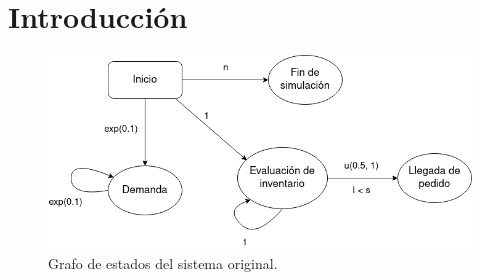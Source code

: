 \documentclass[12pt, spanish]{article}
\makeatletter
\let\thedate\@date
\makeatother
\begin{document}
\begin{titlepage}
    {\large \thedate}\\[0.5cm]
    {\doclicenseThis}

    \vfill

\end{titlepage}


\tableofcontents
\pagebreak



\section*{Introducción}


\begin{figure}[H]
  \centering
   \includegraphics[width=\textwidth]{grafo_sucesos_original.png}
	\caption{Grafo de estados del sistema original.}
\end{figure}
\end{document}
